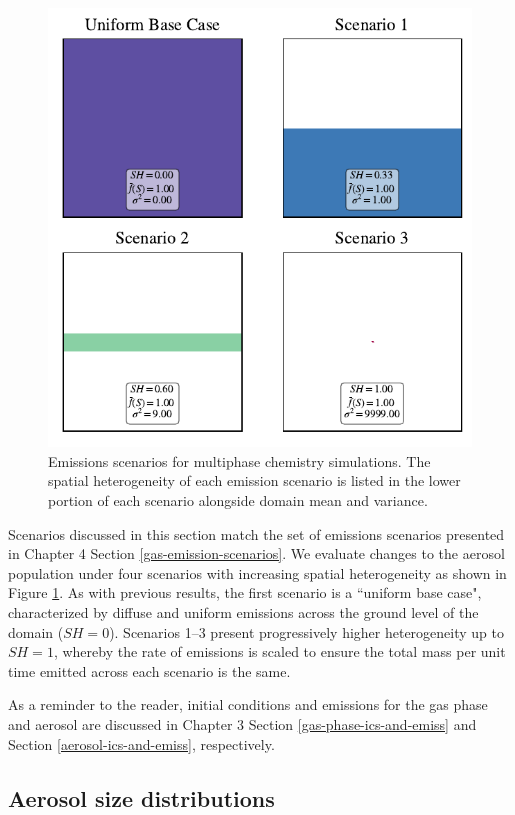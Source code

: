 \begin{figure}[t]
  \centering
    \includegraphics[width=.6\textwidth]{figures/SH-scenarios-main-runs.pdf}
    \caption{Emissions scenarios for multiphase chemistry simulations. The spatial heterogeneity of each emission scenario is listed in the lower portion of each scenario alongside domain mean and variance.
}
    \label{fig:aerosol-emission-scenarios}
\end{figure}

Scenarios discussed in this section match the set of emissions scenarios presented in Chapter 4 Section \ref{gas-emission-scenarios}. We evaluate changes to the aerosol population under four scenarios with increasing spatial heterogeneity as shown in Figure \ref{fig:aerosol-emission-scenarios}. As with previous results, the first scenario is a ``uniform base case", characterized by diffuse and uniform emissions across the ground level of the domain ($SH=0$). Scenarios 1--3 present progressively higher heterogeneity up to $SH=1$, whereby the rate of emissions is scaled to ensure the total mass per unit time emitted across each scenario is the same.

As a reminder to the reader, initial conditions and emissions for the gas phase and aerosol are discussed in Chapter 3 Section \ref{gas-phase-ics-and-emiss} and Section \ref{aerosol-ics-and-emiss}, respectively. 

\subsection{Aerosol size distributions}

